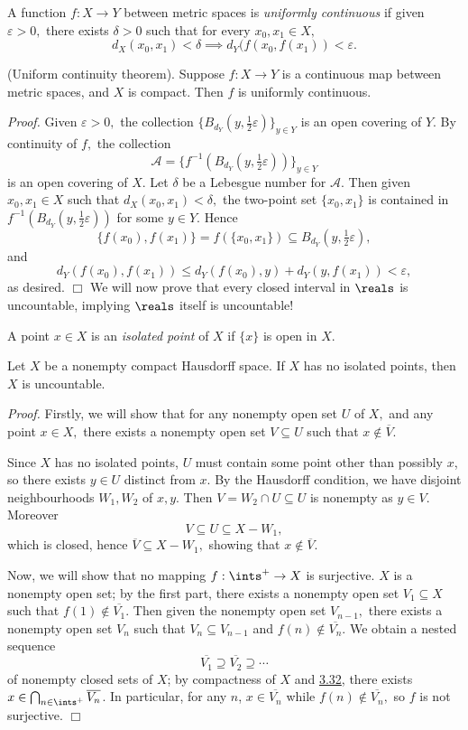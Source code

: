 \begin{definition}\label{3.40}
    A function $f: X \rightarrow Y$ between metric spaces is {\it uniformly continuous} if given $\varepsilon > 0,$ there exists $\delta > 0$ such that for every $x_0, x_1 \in X,$
    $$d_X(x_0, x_1) < \delta \implies d_Y(f(x_0, f(x_1)) < \varepsilon.$$
\end{definition}
\begin{theorem}\label{3.41}
    (Uniform continuity theorem). Suppose $f: X \rightarrow Y$ is a continuous map between metric spaces, and $X$ is compact. Then $f$ is uniformly continuous.
\end{theorem}
{\it Proof.} Given $\varepsilon > 0,$ the collection $\{B_{d_Y}(y, \tfrac12 \varepsilon)\}_{y \in Y}$ is an open covering of $Y.$ By continuity of $f,$ the collection
$$\mathcal{A} = \{f^{-1}(B_{d_Y}(y, \tfrac12\varepsilon))\}_{y \in Y}$$
is an open covering of $X.$ Let $\delta$ be a Lebesgue number for $\mathcal{A}.$ Then given $x_0, x_1 \in X$ such that $d_X(x_0, x_1) < \delta,$ the two-point set $\{x_0, x_1\}$ is contained in $f^{-1}(B_{d_Y}(y, \tfrac12 \varepsilon))$ for some $y \in Y.$ Hence 
$$\{f(x_0), f(x_1)\} = f(\{x_0, x_1\}) \subseteq B_{d_Y}(y, \tfrac12 \varepsilon),$$
and
$$d_Y(f(x_0), f(x_1)) \leq d_Y(f(x_0), y) + d_Y(y, f(x_1)) < \varepsilon,$$
as desired. $\Box$
We will now prove that every closed interval in $\reals$ is uncountable, implying $\reals$ itself is uncountable!
\begin{definition}\label{3.42}
    A point $x \in X$ is an {\it isolated point} of $X$ if $\{x\}$ is open in $X.$
\end{definition}
\begin{theorem}\label{3.43}
    Let $X$ be a nonempty compact Hausdorff space. If $X$ has no isolated points, then $X$ is uncountable.
\end{theorem}
{\it Proof.} Firstly, we will show that for any nonempty open set $U$ of $X,$ and any point $x \in X,$ there exists a nonempty open set $V \subseteq U$ such that $x \notin \overline{V}.$

Since $X$ has no isolated points, $U$ must contain some point other than possibly $x$, so there exists $y \in U$ distinct from $x.$ By the Hausdorff condition, we have disjoint neighbourhoods $W_1, W_2$ of $x, y.$ Then $V = W_2 \cap U \subseteq U$ is nonempty as $y \in V.$ Moreover
$$V \subseteq U \subseteq X-W_1,$$
which is closed, hence $\overline{V} \subseteq X-W_1,$ showing that $x \notin \overline{V}.$

Now, we will show that no mapping $f: \ints^+ \rightarrow X$ is surjective. $X$ is a nonempty open set; by the first part, there exists a nonempty open set $V_1 \subseteq X$ such that $f(1) \notin \overline{V_1}.$ Then given the nonempty open set $V_{n-1},$ there exists a nonempty open set $V_n$ such that $V_n \subseteq V_{n-1}$ and $f(n) \notin \overline{V_n}$. We obtain a nested sequence
$$\overline{V_1} \supseteq \overline{V_2} \supseteq \cdots$$
of nonempty closed sets of $X$; by compactness of $X$ and \hyperref[3.32]{3.32}, there exists $x \in \bigcap_{n \in \ints^+} \overline{V_n}$. In particular, for any $n$, $x \in \overline{V_n}$ while $f(n) \notin \overline{V_n},$ so $f$ is not surjective. $\Box$

